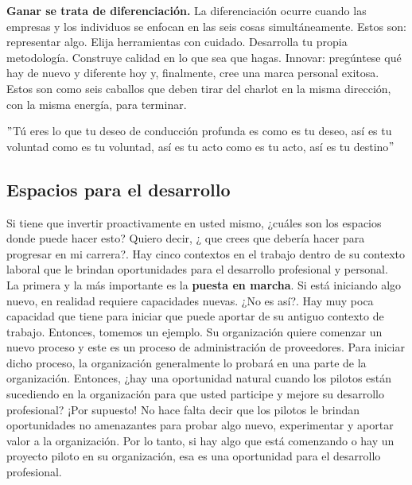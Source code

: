 \documentclass[10pt]{book}
\begin{document}
\textbf{Ganar se trata de diferenciación.} La diferenciación ocurre cuando las empresas y los individuos se enfocan en las seis cosas simultáneamente. Estos son: representar algo. Elija herramientas con cuidado. Desarrolla tu propia metodología. Construye calidad en lo que sea que hagas. Innovar: pregúntese qué hay de nuevo y diferente hoy y, finalmente, cree una marca personal exitosa. Estos son como seis caballos que deben tirar del charlot en la misma dirección, con la misma energía, para terminar.\\
\begin{center}
$"$Tú eres lo que tu deseo de conducción profunda es como es tu deseo, así es tu voluntad como es tu voluntad, así es tu acto como es tu acto, así es tu destino$"$
\end{center}
\subsection{Espacios para el desarrollo}
Si tiene que invertir proactivamente en usted mismo, ¿cuáles son los espacios donde puede hacer esto? Quiero decir, ¿ que crees que debería hacer para progresar en mi carrera?. Hay cinco contextos en el trabajo dentro de su contexto laboral que le brindan oportunidades para el desarrollo profesional y personal.\\
La primera y la más importante es la \textbf{puesta en marcha}. Si está iniciando algo nuevo, en realidad requiere capacidades nuevas. ¿No es así?. Hay muy poca capacidad que tiene para iniciar que puede aportar de su antiguo contexto de trabajo. Entonces, tomemos un ejemplo. Su organización quiere comenzar un nuevo proceso y este es un proceso de administración de proveedores. Para iniciar dicho proceso, la organización generalmente lo probará en una parte de la organización. Entonces, ¿hay una oportunidad natural cuando los pilotos están sucediendo en la organización para que usted participe y mejore su desarrollo profesional? ¡Por supuesto! No hace falta decir que los pilotos le brindan oportunidades no amenazantes para probar algo nuevo, experimentar y aportar valor a la organización. Por lo tanto, si hay algo que está comenzando o hay un proyecto piloto en su organización, esa es una oportunidad para el desarrollo profesional.\\
\end{document}
